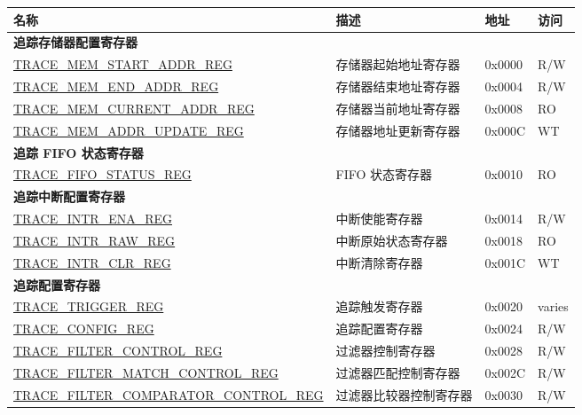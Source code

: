 \begin{longtable}{ | p{8cm} | p{6.2cm} | p{1.3cm} | p{1cm} | }
\hline\rowcolor{lightgray}
\textbf{名称} & \textbf{描述} &  \textbf{地址} & \textbf{访问} \\ \hline
\endhead
\multicolumn{4}{|l|}{\textbf{追踪存储器配置寄存器}} \\ \hline
\hyperref[regdesc:TRACEMEMSTARTADDRREG]{TRACE\_MEM\_START\_ADDR\_REG} & 存储器起始地址寄存器 & 0x0000 & R/W \\ \hline
\hyperref[regdesc:TRACEMEMENDADDRREG]{TRACE\_MEM\_END\_ADDR\_REG} & 存储器结束地址寄存器 & 0x0004 & R/W \\ \hline
\hyperref[regdesc:TRACEMEMCURRENTADDRREG]{TRACE\_MEM\_CURRENT\_ADDR\_REG} & 存储器当前地址寄存器 & 0x0008 & RO \\ \hline
\hyperref[regdesc:TRACEMEMADDRUPDATEREG]{TRACE\_MEM\_ADDR\_UPDATE\_REG} & 存储器地址更新寄存器 & 0x000C & WT \\ \hline
\multicolumn{4}{|l|}{\textbf{追踪 FIFO 状态寄存器}} \\ \hline
\hyperref[regdesc:TRACEFIFOSTATUSREG]{TRACE\_FIFO\_STATUS\_REG} & FIFO 状态寄存器 & 0x0010 & RO \\ \hline
\multicolumn{4}{|l|}{\textbf{追踪中断配置寄存器}} \\ \hline
\hyperref[regdesc:TRACEINTRENAREG]{TRACE\_INTR\_ENA\_REG} & 中断使能寄存器 & 0x0014 & R/W \\ \hline
\hyperref[regdesc:TRACEINTRRAWREG]{TRACE\_INTR\_RAW\_REG} & 中断原始状态寄存器 & 0x0018 & RO \\ \hline
\hyperref[regdesc:TRACEINTRCLRREG]{TRACE\_INTR\_CLR\_REG} & 中断清除寄存器 & 0x001C & WT \\ \hline
\multicolumn{4}{|l|}{\textbf{追踪配置寄存器}} \\ \hline
\hyperref[regdesc:TRACETRIGGERREG]{TRACE\_TRIGGER\_REG} & 追踪触发寄存器 & 0x0020 & varies \\ \hline
\hyperref[regdesc:TRACECONFIGREG]{TRACE\_CONFIG\_REG} & 追踪配置寄存器 & 0x0024 & R/W \\ \hline
\hyperref[regdesc:TRACEFILTERCONTROLREG]{TRACE\_FILTER\_CONTROL\_REG} & 过滤器控制寄存器 & 0x0028 & R/W \\ \hline
\hyperref[regdesc:TRACEFILTERMATCHCONTROLREG]{TRACE\_FILTER\_MATCH\_CONTROL\_REG} & 过滤器匹配控制寄存器 & 0x002C & R/W \\ \hline
\hyperref[regdesc:TRACEFILTERCOMPARATORCONTROLREG]{TRACE\_FILTER\_COMPARATOR\_CONTROL\_REG} & 过滤器比较器控制寄存器 & 0x0030 & R/W \\ \hline

\end{longtable}
